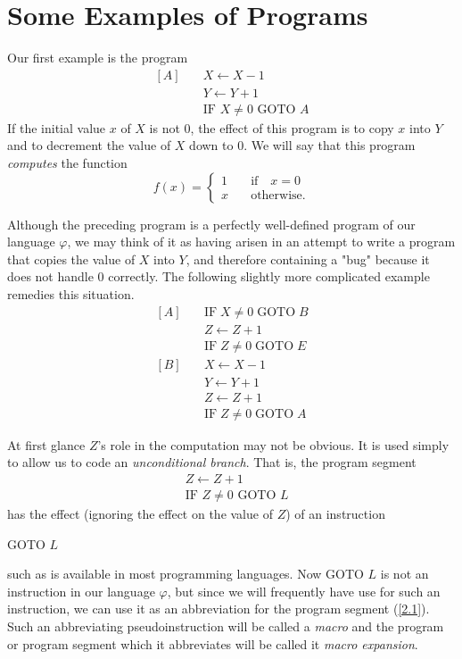 \documentclass[a4paper,10pt,twoside]{book}
\begin{document}
\section{Some Examples of Programs}

Our first example is the program
\begin{equation*}
    \begin{array}{ll}[A]&\quad X\leftarrow X-1\\ &\quad Y\leftarrow Y+1\\ &\quad\text{IF }X\neq0\text{ GOTO }A\end{array}
\end{equation*}
If the initial value $x$ of $X$ is not 0,  the effect of this program is to copy $x$ into $Y$ and to decrement the value of $X$ down to 0. We will say that this program \textit{computes} the function $$f(x)=\left\{\begin{matrix}1&\quad\text{if}\quad x=0\\x&\quad\text{otherwise.}\end{matrix}\right.$$

Although the preceding program is a perfectly well-defined program of our language $\varphi$,  we may think of it as having arisen in an attempt to write a program that copies the value of $X$ into $Y$, and therefore containing a "bug" because it does not handle 0 correctly. The following slightly more complicated example remedies this situation.
\begin{equation*}
    \begin{aligned}[A]\quad&\mathrm{IF}\;X\neq0\;\mathrm{GOTO}\;B\\&Z\leftarrow Z+1\\&\mathrm{IF}\;Z\neq0\;\mathrm{GOTO}\;E\\ [B]\quad&X\leftarrow X-1\\&Y\leftarrow Y+1\\&Z\leftarrow Z+1\\&\mathrm{IF}\;Z\neq0\;\mathrm{GOTO}\;A\end{aligned}
\end{equation*}

At first glance $Z$'s role in the computation may not be obvious. It is used simply to allow us to code an \textit{unconditional branch}. That is, the program segment
\begin{equation}
    \begin{aligned}&Z\leftarrow Z+1\\&\text{IF }Z\neq 0\text{ GOTO }L\end{aligned}
    \label{2.1}
\end{equation}
has the effect (ignoring the effect on the value of $Z$) of an instruction
\begin{center}
    GOTO $L$
\end{center}
such as is available in most programming languages. Now GOTO $L$ is not an instruction in our language $\varphi$, but since we will frequently have use for such an instruction, we can use it as an abbreviation for the program segment (\ref{2.1}). Such an abbreviating pseudoinstruction will be called a \textit{macro} and the program or program segment which it abbreviates will be called it \textit{macro expansion}.
\end{document}
